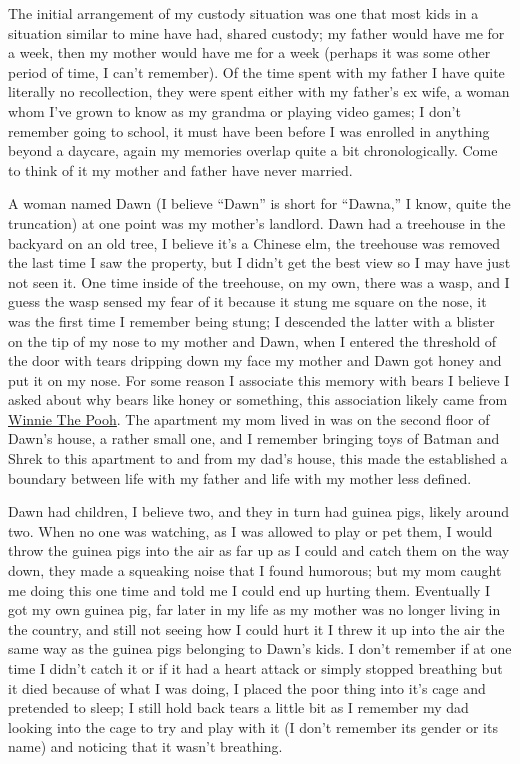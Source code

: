 \documentclass[12pt]{article}
\begin{document}
The initial arrangement of my custody situation was one that most kids in a
situation similar to mine have had, shared custody; my father would have me
for a week, then my mother would have me for a week (perhaps it was some
other period of time, I can't remember).
Of the time spent with my father I have quite literally no recollection, they
were spent either with my father's ex wife, a woman whom I've grown to know
as my grandma or playing video games; I don't remember going to school, it
must have been before I was enrolled in anything beyond a daycare, again my
memories overlap quite a bit chronologically.
Come to think of it my mother and father have never married.

A woman named Dawn (I believe ``Dawn'' is short for ``Dawna,'' I know, quite the
truncation) at one point was my mother's landlord.
Dawn had a treehouse in the backyard on an old tree, I believe it's a Chinese
elm, the treehouse was removed the last time I saw the property, but I 
didn't get the best view so I may have just not seen it. 
One time inside of the treehouse, on my own, there was a wasp, and I guess the
wasp sensed my fear of it because it stung me square on the nose, it was the
first time I remember being stung; I descended the latter with a blister on
the tip of my nose to my mother and Dawn, when I entered the threshold of
the door with tears dripping down my face my mother and Dawn got honey and
put it on my nose.
For some reason I associate this memory with bears I believe I asked about why
bears like honey or something, this association likely came from 
{\color{blue}\underline{\href{https://winniethepooh.disney.com/}{Winnie
The Pooh}}}.
The apartment my mom lived in was on the second floor of Dawn's house, a rather
small one, and I remember bringing toys of Batman and Shrek to this
apartment to and from my dad's house, this made the established a boundary
between life with my father and life with my mother less defined.

Dawn had children, I believe two, and they in turn had guinea pigs, likely
around two.
When no one was watching, as I was allowed to play or pet them, I would throw
the guinea pigs into the air as far up as I could and catch them on the way
down, they made a squeaking noise that I found humorous; but my mom caught
me doing this one time and told me I could end up hurting them.
Eventually I got my own guinea pig, far later in my life as my mother was no
longer living in the country, and still not seeing how I could hurt it I
threw it up into the air the same way as the guinea pigs belonging to Dawn's
kids.
I don't remember if at one time I didn't catch it or if it had a heart attack or
simply stopped breathing but it died because of what I was doing, I placed
the poor thing into it's cage and pretended to sleep; I still hold back
tears a little bit as I remember my dad looking into the cage to try and
play with it (I don't remember its gender or its name) and noticing that it
wasn't breathing.
\end{document}
